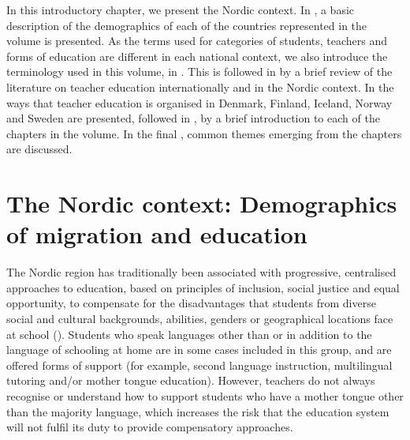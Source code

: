 \documentclass[output=paper]{langscibook}
\begin{document}
In this introductory chapter, we present the Nordic context.  In , a basic description of the demographics of each of the countries represented in the volume is presented. As the terms used for categories of students, teachers and forms of education are different in each national context, we also introduce the terminology used in this volume, in . This is followed in  by a brief review of the literature on teacher education internationally and in the Nordic context. In  the ways that teacher education is organised in Denmark, Finland, Iceland, Norway and Sweden are presented, followed in , by a brief introduction to each of the chapters in the volume. In the final , common themes emerging from the chapters are discussed.  

\section{The Nordic context: Demographics of migration and education}\label{sec:reath:2}

The Nordic region has traditionally been associated with progressive, centralised approaches to education, based on principles of inclusion, social justice and equal opportunity, to compensate for the disadvantages that students from diverse social and cultural backgrounds, abilities, genders or geographical locations face at school (\citealt{BlossingEtAl2014,Elstad2020,Frones2020}). Students who speak languages other than or in addition to the language of schooling at home are in some cases included in this group, and are offered forms of support (for example, second language instruction, multilingual tutoring and/or mother tongue education). However, teachers do not always recognise or understand how to support students who have a mother tongue other than the majority language, which increases the risk that the education system will not fulfil its duty to provide compensatory approaches.
\end{document}
